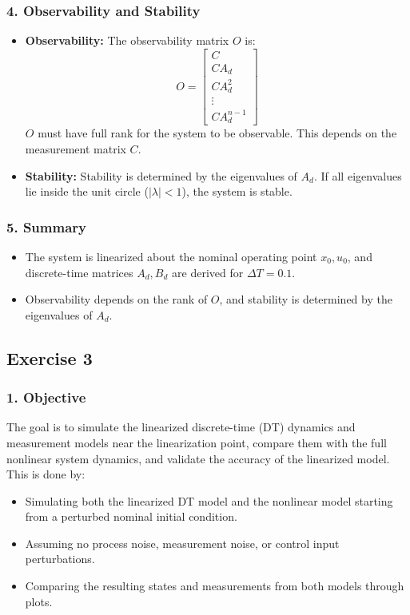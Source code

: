 \subsubsection*{4. Observability and Stability}
\begin{itemize}
    \item \textbf{Observability:} The observability matrix \( O \) is:
    \[
    O = \begin{bmatrix}
    C \\
    C A_d \\
    C A_d^2 \\
    \vdots \\
    C A_d^{n-1}
    \end{bmatrix}
    \]
    \( O \) must have full rank for the system to be observable. This depends on the measurement matrix \( C \).

    \item \textbf{Stability:} Stability is determined by the eigenvalues of \( A_d \). If all eigenvalues lie inside the unit circle (\( |\lambda| < 1 \)), the system is stable.
\end{itemize}

\subsubsection*{5. Summary}
\begin{itemize}
    \item The system is linearized about the nominal operating point \( x_0, u_0 \), and discrete-time matrices \( A_d, B_d \) are derived for \( \Delta T = 0.1 \).
    \item Observability depends on the rank of \( O \), and stability is determined by the eigenvalues of \( A_d \).
\end{itemize}

\subsection*{Exercise 3}


\subsubsection*{1. Objective}
The goal is to simulate the linearized discrete-time (DT) dynamics and measurement models near the linearization point, compare them with the full nonlinear system dynamics, and validate the accuracy of the linearized model. This is done by:
\begin{itemize}
    \item Simulating both the linearized DT model and the nonlinear model starting from a perturbed nominal initial condition.
    \item Assuming no process noise, measurement noise, or control input perturbations.
    \item Comparing the resulting states and measurements from both models through plots.
\end{itemize}

